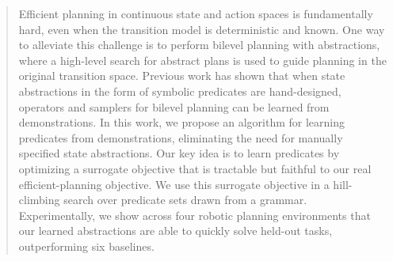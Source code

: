 \begin{abstract}
Efficient planning in continuous state and action spaces is fundamentally hard, even when the transition model is deterministic and known.
One way to alleviate this challenge is to perform bilevel planning with abstractions, where a high-level search for abstract plans is used to guide planning in the original transition space.
Previous work has shown that when state abstractions in the form of symbolic predicates are hand-designed, operators and samplers for bilevel planning can be learned from demonstrations.
In this work, we propose an algorithm for learning predicates from demonstrations, eliminating the need for manually specified state abstractions.
Our key idea is to learn predicates by optimizing a surrogate objective that is tractable but faithful to our real efficient-planning objective.
We use this surrogate objective in a hill-climbing search over predicate sets drawn from a grammar.
Experimentally, we show across four robotic planning environments that our learned abstractions are able to quickly solve held-out tasks, outperforming six baselines.
\end{abstract}
